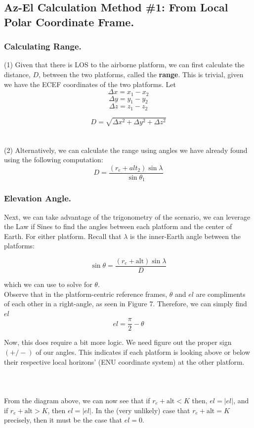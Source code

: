 \documentclass{article}
\begin{document}
\subsection*{Az-El Calculation Method \#1: From Local Polar Coordinate Frame.}
\subsubsection*{Calculating Range.}
(1) Given that there is LOS to the airborne platform, we can first calculate the distance, $D$,
between the two platforms, called the \textbf{range}. This is trivial, given we have the ECEF coordinates of the two platforms. Let 
$$\Delta x = x_1-x_2$$
$$\Delta y = y_1-y_2$$
$$\Delta z = z_1-z_2$$

$$D = \sqrt{\Delta x^2 + \Delta y^2 + \Delta z^2}$$
\\\\
(2) Alternatively, we can calculate the range using angles we have already found using the following computation:
$$D = \frac{(r_e+alt_2)\sin\lambda}{\sin\theta_1}$$

\subsubsection*{Elevation Angle.}
Next, we can take advantage of the trigonometry of the scenario, we can leverage the Law
if Sines to find the angles between each platform and the center of Earth. For either 
platform. Recall that $\lambda$ is the inner-Earth angle between the platforms:

$$\sin\theta = \frac{(r_e+\text{alt})\sin\lambda}{D}$$

which we can use to solve for $\theta$. \\
Observe that in the platform-centric reference frames, $\theta$ and $el$ are compliments of each other 
in a right-angle, as seen in Figure 7.
Therefore, we can simply find $el$
$$el = \frac{\pi}{2} - \theta$$

Now, this does require a bit more logic. We need figure out the proper sign $(+/-)$ of our angles. This 
indicates if each platform is looking above or below their respective local horizons' (ENU coordinate system)
at the other platform. 
\\\\
\\\\
From the diagram above, we can now see that if 
$r_e + \text{alt} < K$
then, $el = |el|$, and if $r_e + \text{alt} > K$, then $el = |el|$. In the (very unlikely) case that
$r_e + \text{alt} = K$ precisely, then it must be the case that $el = 0$. 
\end{document}
